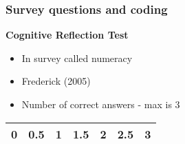 \documentclass{beamer}              %
\begin{document}
\begin{frame}\label{Questions}

\frametitle{Survey questions and coding}
\linespread{1.2}
\textbf{Cognitive Reflection Test} \\
\begin{itemize}
 \item In survey called numeracy
 \item Frederick (2005)
 \item Number of correct answers - max is 3
\end{itemize}

\vspace{0.3cm}
\begin{tabular}{lllllll} 
\hline
\multicolumn{1}{c}{0} & \multicolumn{1}{c}{0.5} & \multicolumn{1}{c}{1}  & \multicolumn{1}{c}{1.5} & \multicolumn{1}{c}{2} & \multicolumn{1}{c}{2.5} & \multicolumn{1}{c}{3}\\
\hline
\end{tabular}

\vspace{1.3cm}


\end{frame}


\end{document}
